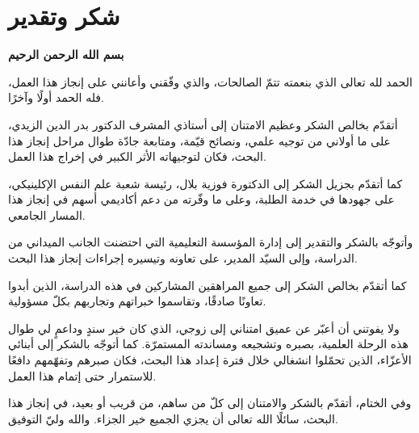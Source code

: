 \documentclass[12pt,oneside]{report}
\begin{document}
\chapter*{شكر وتقدير}
\begin{center}\bfseries بسم الله الرحمن الرحيم\end{center}
الحمد لله تعالى الذي بنعمته تتمّ الصالحات، والذي وفّقني وأعانني على إنجاز هذا العمل، فله الحمد
أولًا وآخرًا.\par
أتقدّم بخالص الشكر وعظيم الامتنان إلى أستاذي المشرف الدكتور بدر الدين الزيدي، على ما أولاني من
توجيه علمي، ونصائح قيّمة، ومتابعة جادّة طوال مراحل إنجاز هذا البحث، فكان لتوجيهاته الأثر الكبير
في إخراج هذا العمل.\par
كما أتقدّم بجزيل الشكر إلى الدكتورة فوزية بلال، رئيسة شعبة علم النفس الإكلينيكي، على جهودها في
خدمة الطلبة، وعلى ما وفّرته من دعم أكاديمي أسهم في إنجاز هذا المسار الجامعي.\par
وأتوجّه بالشكر والتقدير إلى إدارة المؤسسة التعليمية التي احتضنت الجانب الميداني من الدراسة،
وإلى السيّد المدير، على تعاونه وتيسيره إجراءات إنجاز هذا البحث.\par
كما أتقدّم بخالص الشكر إلى جميع المراهقين المشاركين في هذه الدراسة، الذين أبدوا تعاونًا صادقًا،
وتقاسموا خبراتهم وتجاربهم بكلّ مسؤولية.\par
ولا يفوتني أن أعبّر عن عميق امتناني إلى زوجي، الذي كان خير سندٍ وداعمٍ لي طوال هذه الرحلة
العلمية، بصبره وتشجيعه ومساندته المستمرّة. كما أتوجّه بالشكر إلى أبنائي الأعزّاء، الذين تحمّلوا
انشغالي خلال فترة إعداد هذا البحث، فكان صبرهم وتفهّمهم دافعًا للاستمرار حتى إتمام هذا العمل.\par
وفي الختام، أتقدّم بالشكر والامتنان إلى كلّ من ساهم، من قريب أو بعيد، في إنجاز هذا البحث، سائلًا
الله تعالى أن يجزي الجميع خير الجزاء. والله وليّ التوفيق.

\end{document}
